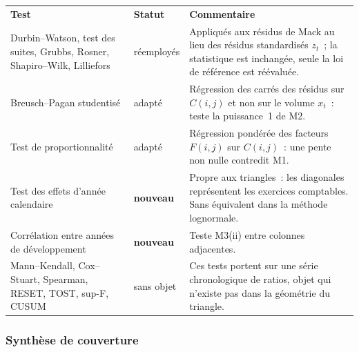 \documentclass[a4paper,11pt]{article}
\begin{document}
\begin{center}
\small
{}
\begin{tabular}{@{}p{4.9cm}p{2.3cm}p{7.6cm}@{}}
\rowcolor{tableheader}
\textcolor{financeblue}{\textbf{Test}} &
\textcolor{financeblue}{\textbf{Statut}} &
\textcolor{financeblue}{\textbf{Commentaire}} \\
Durbin--Watson, test des suites, Grubbs, Rosner, Shapiro--Wilk, Lilliefors &
réemployés & Appliqués aux résidus de Mack au lieu des résidus standardisés
$z_t$~; la
statistique est inchangée, seule la loi de référence est réévaluée. \\
Breusch--Pagan studentisé & adapté & Régression des carrés des résidus sur
$C(i,j)$ et non sur le volume $x_t$~: teste la puissance~1 de M2. \\
Test de proportionnalité & adapté & Régression pondérée des facteurs $F(i,j)$
sur $C(i,j)$~: une pente non nulle contredit M1. \\
Test des effets d'année calendaire & \textbf{nouveau} & Propre aux triangles~:
les diagonales représentent les exercices comptables. Sans équivalent dans la
méthode lognormale. \\
Corrélation entre années de développement & \textbf{nouveau} & Teste M3(ii)
entre colonnes adjacentes. \\
Mann--Kendall, Cox--Stuart, Spearman, RESET, TOST, sup-F, CUSUM &
sans objet & Ces tests portent sur une série chronologique de ratios, objet qui
n'existe pas dans la géométrie du triangle. \\
\end{tabular}
\end{center}

\subsubsection*{Synthèse de couverture}
\end{document}
